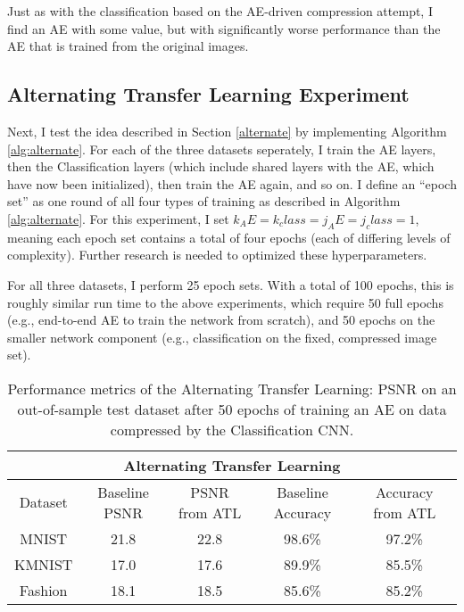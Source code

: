 \documentclass[twoside,11pt]{article}
\begin{document}
Just as with the classification based on the AE-driven compression attempt, 
I find an AE with some value, but with 
significantly worse performance than the AE that is trained from the original images.

\subsection{Alternating Transfer Learning Experiment}

Next, I test the idea described in Section \ref{alternate} by implementing Algorithm \ref{alg:alternate}.
For each of the three datasets seperately, I train the AE layers, then the Classification layers
(which include shared layers with the AE, which have now been initialized), then train the AE again,
and so on. I define an ``epoch set'' as one round of all four types of training as described in 
Algorithm \ref{alg:alternate}. For this experiment, I set $k_AE = k_class = j_AE = j_class = 1$, 
meaning each epoch set contains a total of four epochs (each of differing levels of complexity).
Further research is needed to optimized these hyperparameters.

For all three datasets, I perform 25 epoch sets. With a total of 100 epochs, this is roughly
similar run time to the above experiments, which require 50 full epochs (e.g., end-to-end AE
to train the network from scratch), and 50 epochs on the smaller network component 
(e.g., classification on the fixed, compressed image set).


\begin{table}[h]
  \centering
  \begin{tabular}{|c||c|c|c|c|}
    \hline
    \multicolumn{5}{|c|}{Alternating Transfer Learning}\\
    \hline
    Dataset & Baseline PSNR  & PSNR from ATL & Baseline Accuracy & Accuracy from ATL \\   \hline
    MNIST & 21.8 & 22.8 & 98.6\% & 97.2\% \\   \hline
    KMNIST & 17.0 & 17.6 & 89.9\% & 85.5\% \\   \hline
    Fashion & 18.1 & 18.5 & 85.6\% & 85.2\% \\   \hline  

  \end{tabular}
  \caption{Performance metrics of the Alternating Transfer Learning:
   PSNR on an out-of-sample test dataset after 50 epochs of training an AE on
   data compressed by the Classification CNN.}
  \label{table:alternate}
\end{table}
\end{document}
